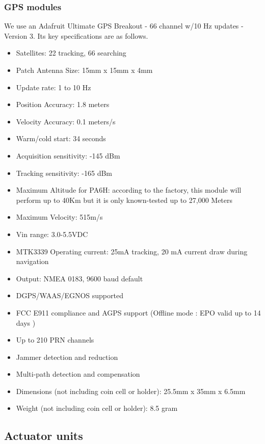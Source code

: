 \documentclass[a4paper, 10pt, twocolumn, titlepage]{article}
\begin{document}
\subsubsection{GPS modules}
We use an Adafruit Ultimate GPS Breakout - 66 channel w/10 Hz updates - Version 3.
Its key specifications are as follows.
\begin{itemize}
\itemsep-1mm
  \item Satellites: 22 tracking, 66 searching
  \item Patch Antenna Size: 15mm x 15mm x 4mm
  \item Update rate: 1 to 10 Hz
  \item Position Accuracy: 1.8 meters
  \item Velocity Accuracy: 0.1 meters/s
  \item Warm/cold start: 34 seconds
  \item Acquisition sensitivity: -145 dBm
  \item Tracking sensitivity: -165 dBm
  \item Maximum Altitude for PA6H: according to the factory, this module will perform up to 40Km but it is only known-tested up to 27,000 Meters
  \item Maximum Velocity: 515m/s
  \item Vin range: 3.0-5.5VDC
  \item MTK3339 Operating current: 25mA tracking, 20 mA current draw during navigation
  \item Output: NMEA 0183, 9600 baud default
  \item DGPS/WAAS/EGNOS supported
  \item FCC E911 compliance and AGPS support (Offline mode : EPO valid up to 14 days )
  \item Up to 210 PRN channels
  \item Jammer detection and reduction
  \item Multi-path detection and compensation
  \item Dimensions (not including coin cell or holder): 25.5mm x 35mm x 6.5mm
  \item Weight (not including coin cell or holder): 8.5 gram
\end{itemize}

\subsection{Actuator units}
\end{document}
